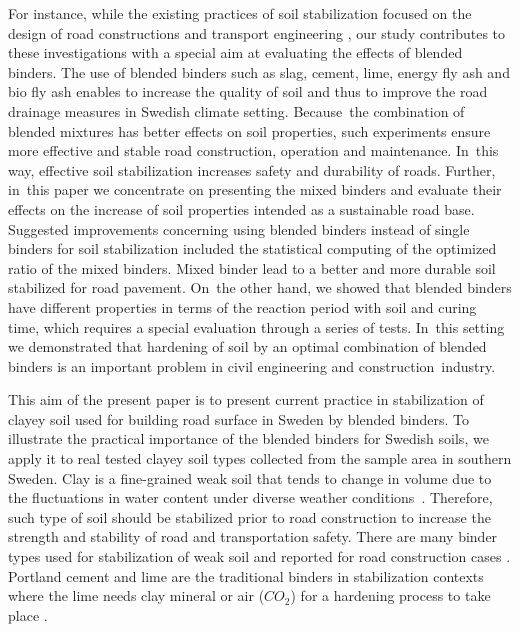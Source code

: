 \documentclass[constrmater,article,accept,pdftex,moreauthors]{Definitions/mdpi}
\begin{document}
{For instance, while the existing practices of soil stabilization focused on the design of }road constructions and transport engineering \citep{Celauro,Glossop,Markwick,Nelson,Olsenetal2022,LindhLemenkovaTTJ,Sear}, our study contributes to these investigations with a special aim at evaluating the effects of blended binders. {The use of blended binders }such as slag, cement, lime, energy fly ash and bio fly ash {enables to increase the quality of soil and thus to improve the road drainage measures in Swedish climate setting. Because~the combination of blended mixtures has better effects on soil properties, such experiments ensure more effective and stable road  construction, operation and maintenance. In~this way, effective }soil stabilization {increases} safety and durability of roads. {Further}, in~this paper we concentrate on presenting the mixed binders and evaluate their effects on the increase of soil properties intended as a sustainable road base. {Suggested improvements concerning using blended binders instead of single binders for soil stabilization included the statistical computing of the optimized ratio of the mixed binders.} Mixed binder {lead} to a better and more durable{ soil stabilized} for road pavement. On~the other hand, {we showed that }blended binders have different properties in terms of the reaction period with soil and curing time, which requires a special evaluation through a series of tests. In~this setting {we demonstrated that }hardening of soil {by} an optimal combination of blended binders {is} an important problem in civil engineering and construction~industry. 

{This aim of the present paper is to present current practice in stabilization of clayey soil used for building road surface in Sweden by blended binders. }To illustrate the practical importance of the blended binders for Swedish soils, we apply it to real tested clayey soil types collected from the sample area in southern Sweden. Clay is a fine-grained weak soil that tends to change in volume due to the fluctuations in water content under diverse weather conditions~\cite{Sudhakar}. Therefore, such type of soil should be stabilized prior to road construction to increase the strength and stability of road and transportation safety. There are many binder types used for stabilization of weak soil and reported for road construction cases \citep{Antunes,Park}. Portland cement and lime are the traditional binders in stabilization contexts where the lime needs clay mineral or air ($CO_2$) for a hardening process to take place \citep{Bell,Hilt,LindhLemenkovaCEE,Taylor}. 
\end{document}
